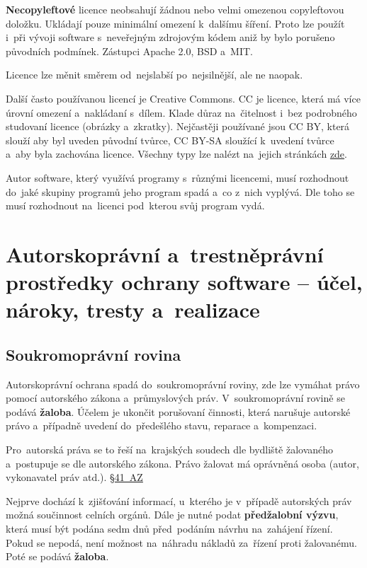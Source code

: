 \textbf{Necopyleftové} licence neobsahují žádnou nebo velmi omezenou copyleftovou doložku. Ukládají pouze minimální omezení k~dalšímu šíření. Proto lze použít i~při vývoji software s~neveřejným zdrojovým kódem aniž by bylo porušeno původních podmínek. Zástupci Apache 2.0, BSD a~MIT.

Licence lze měnit směrem od~nejslabší po~nejsilnější, ale ne naopak.

Další často používanou licencí je Creative Commons. CC je licence, která má více úrovní omezení a~nakládaní s~dílem. Klade důraz na~čitelnost i~bez podrobného studovaní licence (obrázky a~zkratky). Nejčastěji používané jsou CC BY, která slouží aby byl uveden původní tvůrce, CC BY-SA sloužící k~uvedení tvůrce a~aby byla zachována licence. Všechny typy lze nalézt na~jejich stránkách \href{https://creativecommons.org/licenses/}{zde}.

Autor software, který využívá programy s~různými licencemi, musí rozhodnout do~jaké skupiny programů jeho program spadá a~co z~nich vyplývá. Dle toho se musí rozhodnout na~licenci pod~kterou svůj program vydá.

\clearpage
\section{Autorskoprávní a~trestněprávní prostředky ochrany software -- účel, nároky, tresty a~realizace}

\subsection{Soukromoprávní rovina}

Autorskoprávní ochrana spadá do~soukromoprávní roviny, zde lze vymáhat právo pomocí autorského zákona a~průmyslových práv. V~soukromoprávní rovině se podává \textbf{žaloba}. Účelem je ukončit porušovaní činnosti, která narušuje autorské právo a~případně uvedení do~předešlého stavu, reparace a~kompenzaci.

Pro~autorská práva se to řeší na~krajských soudech dle bydliště žalovaného a~postupuje se dle autorského zákona. Právo žalovat má oprávněná osoba (autor, vykonavatel práv atd.). \href{https://www.zakonyprolidi.cz/cs/2000-121#p41}{§41~AZ}

Nejprve dochází k~zjišťování informací, u~kterého je v~případě autorských práv možná součinnost celních orgánů. Dále je nutné podat \textbf{předžalobní výzvu}, která musí být podána sedm dnů před~podáním návrhu na~zahájení řízení. Pokud se nepodá, není možnost na~náhradu nákladů za~řízení proti žalovanému. Poté se podává \textbf{žaloba}.

